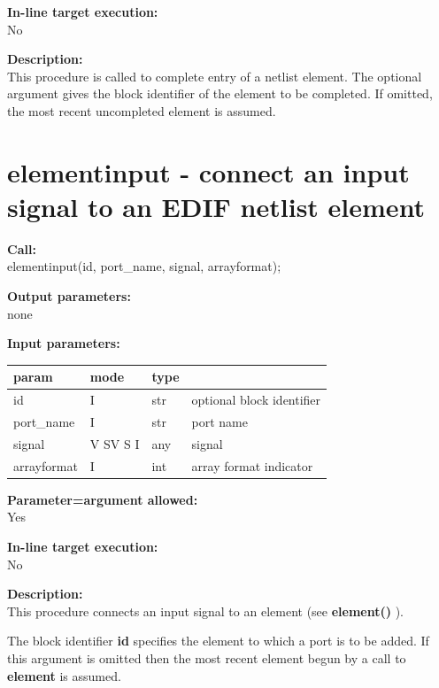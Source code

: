         {\bf In-line target execution:} \\
        No
        
        {\bf Description:} \\
        This procedure is called to complete entry of a netlist element.
        The optional argument gives the block identifier of the element
        to be completed. If omitted, the most recent uncompleted element
        is assumed.



    \section{elementinput - connect an input signal to an EDIF netlist element}\label{sec:ipelmntin}
        
        {\bf Call:} \\
        elementinput(id, port\_name, signal, arrayformat);
        
        {\bf Output parameters:} \\
        none
        
        {\bf Input parameters:} \\
        \begin{tabular}{| l | l | l | l |}
        \hline
        param  & mode     & type  & \\
        \hline \hline
        id          & I          & str & optional block identifier \\ \hline
        port\_name  & I          & str & port name                 \\ \hline
        signal      & V SV S I   & any & signal                    \\ \hline
        arrayformat & I          & int & array format indicator    \\ \hline
        \end{tabular}
        
        {\bf Parameter=argument allowed:} \\
        Yes
        
        {\bf In-line target execution:} \\
        No
        
        {\bf Description:} \\
        This procedure connects an input signal to an element (see {\bf element()}
        ).
        
        The block identifier {\bf id} specifies the element to which a port is to
        be added. If this argument is omitted then the most recent
        element begun by a call to {\bf element} is assumed.
        
